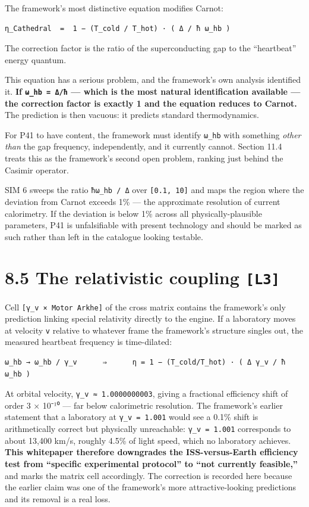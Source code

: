 \documentclass[
  11pt]{report}
\begin{document}
The framework's most distinctive equation modifies Carnot:

\begin{verbatim}
η_Cathedral  =  1 − (T_cold / T_hot) · ( Δ / ħ ω_hb )
\end{verbatim}

The correction factor is the ratio of the superconducting gap to the
``heartbeat'' energy quantum.

This equation has a serious problem, and the framework's own analysis
identified it. \textbf{If \texttt{ω\_hb\ =\ Δ/ħ} --- which is the most
natural identification available --- the correction factor is exactly 1
and the equation reduces to Carnot.} The prediction is then vacuous: it
predicts standard thermodynamics.

For P41 to have content, the framework must identify \texttt{ω\_hb} with
something \emph{other than} the gap frequency, independently, and it
currently cannot. Section 11.4 treats this as the framework's second
open problem, ranking just behind the Casimir operator.

SIM 6 sweeps the ratio \texttt{ħω\_hb\ /\ Δ} over
\texttt{{[}0.1,\ 10{]}} and maps the region where the deviation from
Carnot exceeds 1\% --- the approximate resolution of current
calorimetry. If the deviation is below 1\% across all
physically-plausible parameters, P41 is unfalsifiable with present
technology and should be marked as such rather than left in the
catalogue looking testable.

\hypertarget{the-relativistic-coupling-l3}{%
\section{\texorpdfstring{8.5 The relativistic coupling
\texttt{{[}L3{]}}}{8.5 The relativistic coupling {[}L3{]}}}\label{the-relativistic-coupling-l3}}

Cell \texttt{{[}γ\_v\ ×\ Motor\ Arkhe{]}} of the cross matrix contains
the framework's only prediction linking special relativity directly to
the engine. If a laboratory moves at velocity \texttt{v} relative to
whatever frame the framework's structure singles out, the measured
heartbeat frequency is time-dilated:

\begin{verbatim}
ω_hb → ω_hb / γ_v      ⇒      η = 1 − (T_cold/T_hot) · ( Δ γ_v / ħ ω_hb )
\end{verbatim}

At orbital velocity, \texttt{γ\_v\ ≈\ 1.0000000003}, giving a fractional
efficiency shift of order 3 × 10⁻¹⁰ --- far below calorimetric
resolution. The framework's earlier statement that a laboratory at
\texttt{γ\_v\ =\ 1.001} would see a 0.1\% shift is arithmetically
correct but physically unreachable: \texttt{γ\_v\ =\ 1.001} corresponds
to about 13,400 km/s, roughly 4.5\% of light speed, which no laboratory
achieves. \textbf{This whitepaper therefore downgrades the
ISS-versus-Earth efficiency test from ``specific experimental protocol''
to ``not currently feasible,''} and marks the matrix cell accordingly.
The correction is recorded here because the earlier claim was one of the
framework's more attractive-looking predictions and its removal is a
real loss.
\end{document}
